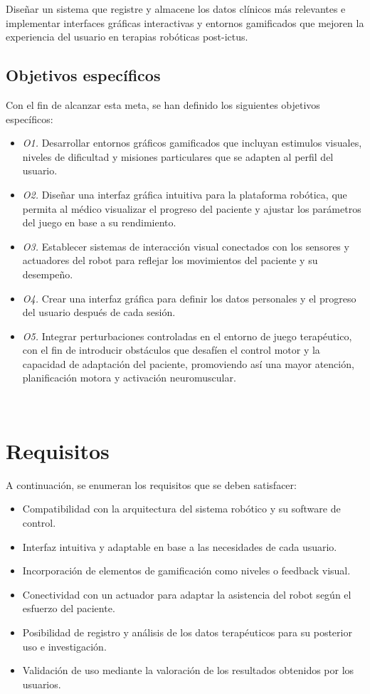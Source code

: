 Diseñar un sistema que registre y almacene los datos clínicos más relevantes e implementar interfaces gráficas interactivas y entornos gamificados que mejoren la experiencia del usuario en terapias robóticas post-ictus.

\subsection{Objetivos específicos}
\label{sec:descripcion}

Con el fin de alcanzar esta meta, se han definido los siguientes objetivos específicos:

\begin{itemize}
    \item \textit{O1.} Desarrollar entornos gráficos gamificados que incluyan estimulos visuales, niveles de dificultad y misiones particulares que se adapten al perfil del usuario.
    \item \textit{O2.} Diseñar una interfaz gráfica intuitiva para la plataforma robótica, que permita al médico visualizar el progreso del paciente y ajustar los parámetros del juego en base a su rendimiento.
    \item \textit{O3.} Establecer sistemas de interacción visual conectados con los sensores y actuadores del robot para reflejar los movimientos del paciente y su desempeño.
    \item \textit{O4.} Crear una interfaz gráfica para definir los datos personales y el progreso del usuario después de cada sesión.
    \item \textit{O5.} Integrar perturbaciones controladas en el entorno de juego terapéutico, con el fin de introducir obstáculos que desafíen el control motor y la capacidad de adaptación del paciente, promoviendo así una mayor atención, planificación motora y activación neuromuscular.
\end{itemize}\

\section{Requisitos}
\label{sec:requisitos}

A continuación, se enumeran los requisitos que se deben satisfacer:

\begin{itemize}
    \item Compatibilidad con la arquitectura del sistema robótico y su software de control.
    \item Interfaz intuitiva y adaptable en base a las necesidades de cada usuario.
    \item Incorporación de elementos de gamificación como niveles o feedback visual.
    \item Conectividad con un actuador para adaptar la asistencia del robot según el esfuerzo del paciente.
    \item Posibilidad de registro y análisis de los datos terapéuticos para su posterior uso e investigación.
    \item Validación de uso mediante la valoración de los resultados obtenidos por los usuarios.
\end{itemize}\

